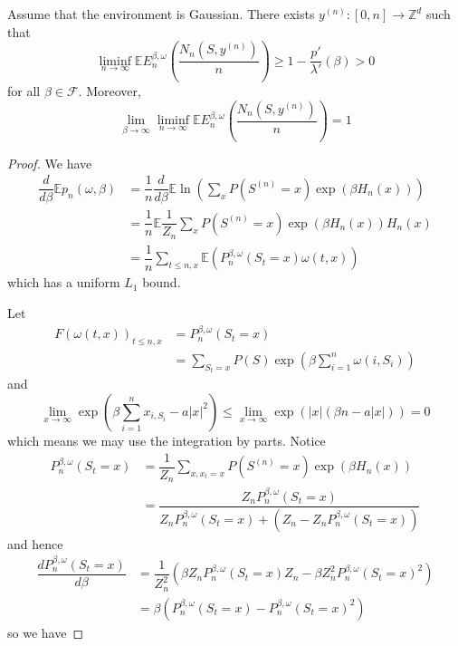 \begin{theorem}
    Assume that the environment is Gaussian. There exists $y^{(n)}:[0,n] \to\mathbb{Z}^d$ such that
    \[
    \liminf_{n\to\infty} \mathbb{E}E_n^{\beta,\omega}\left(\dfrac{N_n(S,y^{(n)})}{n}\right) \geq 1 - \dfrac{p'}{\lambda'}(\beta) > 0
    \]
    for all $\beta \in \mathcal{F}$. Moreover,
    \[
    \lim_{\beta\to\infty} \liminf_{n\to\infty} \mathbb{E}E_n^{\beta,\omega}\left(\dfrac{N_n(S,y^{(n)})}{n}\right) = 1
    \]
\end{theorem}
\begin{proof}
    We have
    \[
    \begin{aligned}
    \dfrac{d}{d\beta}\mathbb{E}p_n(\omega,\beta) &= \dfrac{1}{n}\dfrac{d}{d\beta}\mathbb{E}\ln\left(\sum\limits_{x}P(S^{(n)} = x) \exp(\beta H_n(x))\right) \\
    & = \dfrac{1}{n}\mathbb{E}\dfrac{1}{Z_n}\sum\limits_{x}P(S^{(n)} = x)\exp(\beta H_n(x))H_n(x) \\
    &= \dfrac{1}{n}\sum\limits_{t\leq n,x}\mathbb{E}\left(P_n^{\beta,\omega}(S_t = x)\omega(t,x)\right)
    \end{aligned}
    \]
    which has a uniform $L_1$ bound.\par
    Let \[\begin{aligned}F(\omega(t,x))_{t\leq n, x} &= P_n^{\beta,\omega}(S_t = x) \\
    &= \sum\limits_{S_t = x} P(S)\exp(\beta\sum\limits_{i=1}^n \omega(i,S_i))
    \end{aligned}\]
    and
    \[
    \lim_{x\to\infty} \exp(\beta \sum\limits_{i=1}^n x_{i,S_i} - a|x|^2) \leq \lim_{x\to\infty}\exp(|x|(\beta n-a|x|)) = 0
    \]
    which means we may use the integration by parts. Notice
    \[
    \begin{aligned}
    P_n^{\beta,\omega}(S_t = x) &= \dfrac{1}{Z_n}\sum\limits_{x, x_t = x}P(S^{(n)} = x)\exp(\beta H_n(x)) \\ &= \dfrac{Z_nP_n^{\beta,\omega}(S_t = x)}{Z_nP_n^{\beta,\omega}(S_t = x)+(Z_n - Z_nP_n^{\beta,\omega}(S_t = x))} 
    \end{aligned}
    \]
    and hence
    \[
    \begin{aligned}
        \dfrac{dP_n^{\beta,\omega}(S_t = x)}{d\beta} &= \dfrac{1}{Z_n^2}\left(\beta Z_n P_n^{\beta,\omega}(S_t = x)Z_n - \beta Z_n^2P_n^{\beta,\omega}(S_t = x)^2\right) \\
        & = \beta(P_n^{\beta,\omega}(S_t = x)-P_n^{\beta,\omega}(S_t = x)^2)
    \end{aligned}
    \]
    so we have

\end{proof}
